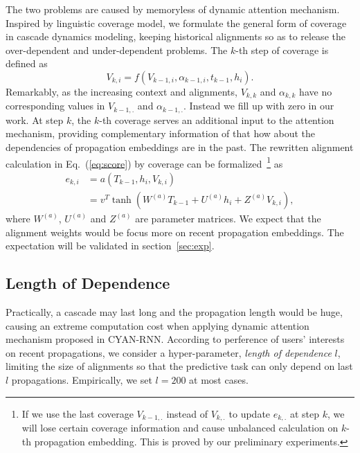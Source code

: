 The two problems are caused by memoryless of dynamic attention mechanism.
Inspired by linguistic coverage model, we formulate the general form of
coverage in cascade dynamics modeling, keeping historical alignments so as to
release the over-dependent and under-dependent problems. The $k$-th step of coverage is defined as
\begin{equation}
\label{eq:cov}
V_{k,i}=f\left(V_{k-1, i}, \alpha_{k-1,i}, t_{k-1}, h_i\right).
\end{equation}
Remarkably, as the increasing context and alignments, $V_{k,k}$ and
$\alpha_{k,k}$ have no corresponding values in $V_{k-1,.}$ and
$\alpha_{k-1,.}$. Instead we fill up with zero in our work. 
At step $k$, the $k$-th coverage serves an additional input to the
attention mechanism, providing complementary information of that how about the
dependencies of propagation embeddings are in the past. The rewritten
alignment calculation in Eq.~(\ref{eq:score}) by coverage can be
formalized~\footnote{
If we use the last coverage $V_{k-1,.}$ instead of
$V_{k,.}$ to update $e_{k,.}$ at step $k$, 
we will lose certain coverage information and cause unbalanced
calculation on $k$-th propagation embedding. This is proved by our preliminary
experiments.} as
\begin{equation}
\label{eq:att_cov}
\begin{aligned}
e_{k,i} &= a(T_{k-1}, h_i, V_{k,i}) \\
& = v^T\tanh(W^{(a)} T_{k-1}+U^{(a)} h_i+Z^{(a)} V_{k,i}),
\end{aligned}
\end{equation}
where $W^{(a)}$, $U^{(a)}$ and $Z^{(a)}$ are parameter matrices. We expect that
the alignment weights would be focus more on recent propagation embeddings. The
expectation will be validated in section~\ref{sec:exp}.

\subsection{Length of Dependence}
Practically, a cascade may last long and the propagation length would be huge,
causing an extreme computation cost when applying dynamic attention mechanism
proposed in CYAN-RNN. According to perference of users' interests on recent
propagations, we consider a hyper-parameter, \emph{length of dependence}
$l$, limiting the size of alignments so that the predictive task can only
depend on last $l$ propagations. Empirically, we set $l=200$ at most cases.

